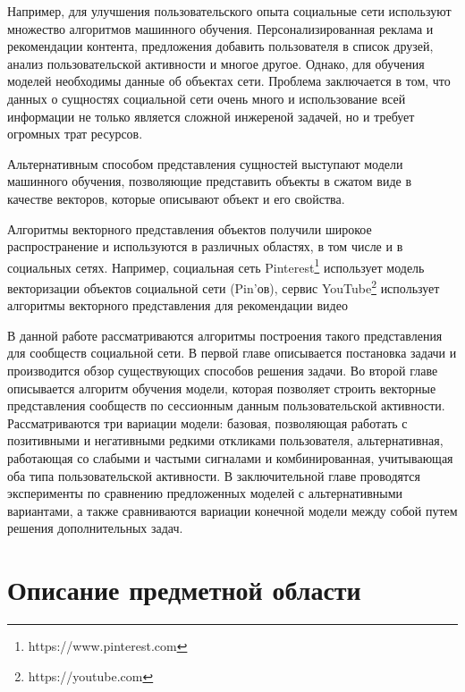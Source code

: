 \documentclass[times,specification,annotation]{itmo-student-thesis}
\begin{document}
Например, для улучшения пользовательского опыта социальные сети используют множество алгоритмов машинного обучения. Персонализированная реклама и рекомендации контента, предложения добавить пользователя в список друзей, анализ пользовательской активности и многое другое. Однако, для обучения моделей необходимы данные об объектах сети. Проблема заключается в том, что данных о сущностях социальной сети очень много и использование всей информации не только является сложной инжереной задачей, но и требует огромных трат ресурсов.   

Альтернативным способом представления сущностей выступают модели машинного обучения, позволяющие представить объекты в сжатом виде в качестве векторов, которые описывают объект и его свойства.


Алгоритмы векторного представления объектов получили широкое распространение и используются в различных областях, в том числе и в социальных сетях. Например, социальная сеть Pinterest\footnote{https://www.pinterest.com} \cite{Liu2017} использует модель векторизации объектов социальной сети (Pin'ов), сервис YouTube\footnote{https://youtube.com} использует алгоритмы векторного представления для рекомендации видео\cite{Covington2016} 

В данной работе рассматриваются алгоритмы построения такого представления для сообществ социальной сети. В первой главе описывается постановка задачи и производится обзор существующих способов решения задачи. Во второй главе описывается алгоритм обучения модели, которая позволяет строить векторные представления сообществ по сессионным данным пользовательской активности. Рассматриваются три вариации модели: базовая, позволяющая работать с позитивными и негативными редкими откликами пользователя, альтернативная, работающая со слабыми и частыми сигналами и комбинированная, учитывающая оба типа пользовательской активности. В заключительной главе проводятся эксперименты по сравнению предложенных моделей с альтернативными вариантами, а также сравниваются вариации конечной модели между собой путем решения дополнительных задач. 

\chapter{Описание предметной области}
\end{document}

